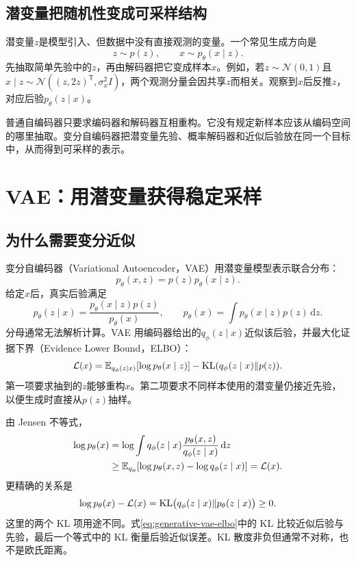 \subsection{潜变量把随机性变成可采样结构}

潜变量$z$是模型引入、但数据中没有直接观测的变量。一个常见生成方向是
\[
z\sim p(z),\qquad x\sim p_{\theta}(x\mid z).
\]
先抽取简单先验中的$z$，再由解码器把它变成样本$x$。例如，若$z\sim\mathcal N(0,1)$且$x\mid z\sim\mathcal N((z,2z)^{\mathsf T},\sigma_x^2I)$，两个观测分量会因共享$z$而相关。观察到$x$后反推$z$，对应后验$p_{\theta}(z\mid x)$。

普通自编码器只要求编码器和解码器互相重构。它没有规定新样本应该从编码空间的哪里抽取。变分自编码器把潜变量先验、概率解码器和近似后验放在同一个目标中，从而得到可采样的表示。

\section{VAE：用潜变量获得稳定采样}

\subsection{为什么需要变分近似}

变分自编码器（Variational Autoencoder，VAE）用潜变量模型表示联合分布：
\begin{equation}
p_{\theta}(x,z)=p(z)p_{\theta}(x\mid z).
\end{equation}
给定$x$后，真实后验满足
\[
p_{\theta}(z\mid x)=\frac{p_{\theta}(x\mid z)p(z)}{p_{\theta}(x)},\qquad
p_{\theta}(x)=\int p_{\theta}(x\mid z)p(z)\,\mathrm dz.
\]
分母通常无法解析计算。VAE 用编码器给出的$q_{\phi}(z\mid x)$近似该后验，并最大化证据下界（Evidence Lower Bound，ELBO）：
\begin{equation}
\mathcal L(x)=\mathbb{E}_{q_{\phi}(z\mid x)}[\log p_{\theta}(x\mid z)]-\operatorname{KL}(q_{\phi}(z\mid x)\|p(z)).
\label{eq:generative-vae-elbo}
\end{equation}
第一项要求抽到的$z$能够重构$x$。第二项要求不同样本使用的潜变量仍接近先验，以便生成时直接从$p(z)$抽样。

由 Jensen 不等式，
\begin{align}
\log p_{\theta}(x)
&=\log\int q_{\phi}(z\mid x)\frac{p_{\theta}(x,z)}{q_{\phi}(z\mid x)}\,\mathrm dz\\
&\geq \mathbb{E}_{q_{\phi}}[\log p_{\theta}(x,z)-\log q_{\phi}(z\mid x)]
=\mathcal L(x).
\end{align}
更精确的关系是
\begin{equation}
\log p_{\theta}(x)-\mathcal L(x)=\operatorname{KL}\bigl(q_{\phi}(z\mid x)\|p_{\theta}(z\mid x)\bigr)\geq0.
\end{equation}
这里的两个 KL 项用途不同。式\eqref{eq:generative-vae-elbo}中的 KL 比较近似后验与先验，最后一个等式中的 KL 衡量后验近似误差。KL 散度非负但通常不对称，也不是欧氏距离。

